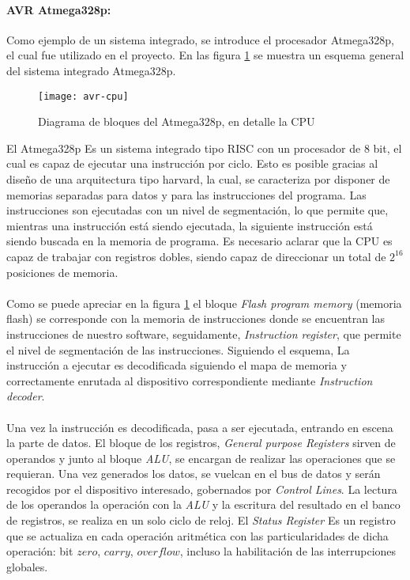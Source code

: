 \paragraph{AVR Atmega328p:} Como ejemplo de un sistema integrado, se introduce el procesador Atmega328p, el cual fue utilizado en el proyecto. 
En las figura \ref{fig:avr-cpu} se muestra un esquema general del sistema integrado Atmega328p. 
\begin{figure}[h]
    \centering
    \texttt{[image: avr-cpu]}
    \caption{Diagrama de bloques del Atmega328p, en detalle la CPU}
    \label{fig:avr-cpu}
\end{figure}
El Atmega328p Es un sistema integrado tipo RISC con un procesador de 8 bit, el cual es capaz de ejecutar una instrucci\'on por ciclo. Esto es posible gracias al diseño de una arquitectura tipo harvard, la cual, se caracteriza por disponer de memorias separadas para datos y para las instrucciones del programa. Las instrucciones son ejecutadas con un nivel de segmentaci\'on, lo que permite que, mientras una instrucción está siendo ejecutada, la siguiente instrucción está siendo buscada en la memoria de programa. Es necesario aclarar que la CPU es capaz de trabajar con registros dobles, siendo capaz de direccionar un total de $2^{16}$ posiciones de memoria.
\paragraph{}
Como se puede apreciar en la figura \ref{fig:avr-cpu} el bloque \textit{Flash program memory} (memoria flash) se corresponde con la memoria de instrucciones donde se encuentran las instrucciones de nuestro software, seguidamente, \textit{Instruction register}, que permite el nivel de segmentaci\'on de las instrucciones. Siguiendo el esquema, La instrucci\'on a ejecutar es decodificada siguiendo el mapa de memoria y correctamente enrutada al dispositivo correspondiente mediante \textit{Instruction decoder}.
\paragraph{}
Una vez la instrucci\'on es decodificada, pasa a ser ejecutada, entrando en escena la parte de datos. El bloque de los registros, \textit{General purpose Registers} sirven de operandos y junto al bloque \textit{ALU}, se encargan de realizar las operaciones que se requieran. Una vez generados los datos, se vuelcan en el bus de datos y ser\'an recogidos por el dispositivo interesado, gobernados por \textit{Control Lines}. La lectura de los operandos la operaci\'on con la \textit{ALU} y la escritura del resultado en el banco de registros, se realiza en un solo ciclo de reloj. El \textit{Status Register} Es un registro que se actualiza en cada operaci\'on aritm\'etica con las particularidades de dicha operaci\'on: bit $zero$, $carry$, $overflow$, incluso la habilitaci\'on de las interrupciones globales.
